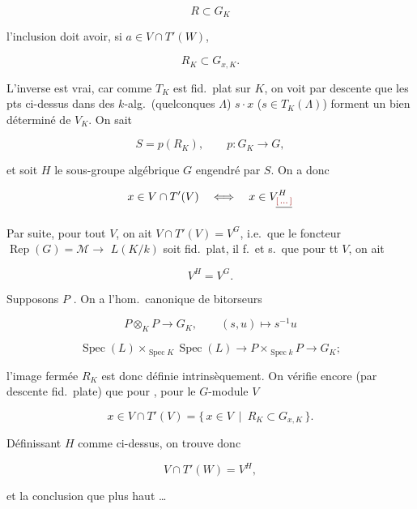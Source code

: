 \documentclass[11pt,a4paper]{article}
\begin{document}
\[ R \subset G_{K} \]


l'inclusion doit avoir, si $a \in V \cap T'(W)$,

\[ R_{K} \subset G_{x,K} . \]

L'inverse est vrai, car comme $T_{K}$ est fid.\ plat sur $K$, on voit par
descente que les pts \ill{} ci-dessus \ill{} dans des $k$-alg.\
(quelconques $\Lambda$) $s \cdot x$ ($s \in T_{K}(\Lambda)$) forment \ill{} un
\ill{} bien déterminé de $V_{K}$. On sait \struck{\ill{}}

\[ S = p(R_{K}) , \qquad p : G_{K} \longrightarrow G , \]

et soit $H$ le sous-groupe algébrique  $G$ engendré par $S$.
On a donc

\[ x \in V \cap T'(V) \quad \Longleftrightarrow \quad x \in V^{H}_{\struck{\ill{}}} \]

\struck{\ill{}}

Par suite,  pour tout $V$, on ait
$V \cap T'(V) = V^{G}$, i.e.\ que le foncteur
$\operatorname{Rep}(G) = \mathcal{M} \longrightarrow$ \ill{} $L(K/k)$ soit fid.\
plat, il f.\ et s.\ que pour tt $V$,  on ait

\[ V^{H} = V^{G} . \]

Supposons $P$ . On a l'hom.\ canonique de bitorseurs

\[ P \otimes_{K} P \longrightarrow G_{K} , \qquad (s, u) \mapsto s^{-1} u \]

\struck{\ill{}}

\[ \operatorname{Spec}(L) \times_{\operatorname{Spec} K} \operatorname{Spec}(L)
\longrightarrow P \times_{\operatorname{Spec} k} P \longrightarrow G_{K} ; \]

l'image fermée $R_{K}$ est donc définie intrinsèquement. On vérifie encore (par
descente fid.\ plate) que pour \ill{}, pour le $G$-module $V$

\[ x \in V \cap T'(V) = \{\, x \in V \ \mid\ R_{K} \subset G_{x,K} \,\} . \]

Définissant $H$ comme ci-dessus, on trouve donc

\[ V \cap T'(W) = V^{H} , \]

et la \ill{} conclusion que plus haut \ldots


\end{document}
